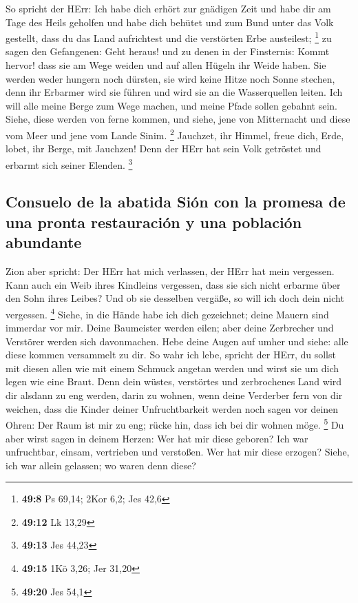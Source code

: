  So spricht der HErr: Ich habe dich erhört zur gnädigen
Zeit und habe dir am Tage des Heils geholfen und habe dich behütet und
zum Bund unter das Volk gestellt, dass du das Land aufrichtest und die
verstörten Erbe austeilest; \footnote{\textbf{49:8} Ps 69,14; 2Kor 6,2;
  Jes 42,6}  zu sagen den Gefangenen: Geht heraus! und zu
denen in der Finsternis: Kommt hervor! dass sie am Wege weiden und auf
allen Hügeln ihr Weide haben.  Sie werden weder hungern
noch dürsten, sie wird keine Hitze noch Sonne stechen, denn ihr Erbarmer
wird sie führen und wird sie an die Wasserquellen leiten.
 Ich will alle meine Berge zum Wege machen, und meine
Pfade sollen gebahnt sein.  Siehe, diese werden von ferne
kommen, und siehe, jene von Mitternacht und diese vom Meer und jene vom
Lande Sinim. \footnote{\textbf{49:12} Lk 13,29} 
Jauchzet, ihr Himmel, freue dich, Erde, lobet, ihr Berge, mit Jauchzen!
Denn der HErr hat sein Volk getröstet und erbarmt sich seiner Elenden.
\footnote{\textbf{49:13} Jes 44,23}

\hypertarget{consuelo-de-la-abatida-siuxf3n-con-la-promesa-de-una-pronta-restauraciuxf3n-y-una-poblaciuxf3n-abundante}{%
\subsection{Consuelo de la abatida Sión con la promesa de una pronta
restauración y una población
abundante}\label{consuelo-de-la-abatida-siuxf3n-con-la-promesa-de-una-pronta-restauraciuxf3n-y-una-poblaciuxf3n-abundante}}

 Zion aber spricht: Der HErr hat mich verlassen, der HErr
hat mein vergessen.  Kann auch ein Weib ihres Kindleins
vergessen, dass sie sich nicht erbarme über den Sohn ihres Leibes? Und
ob sie desselben vergäße, so will ich doch dein nicht vergessen.
\footnote{\textbf{49:15} 1Kö 3,26; Jer 31,20}  Siehe, in
die Hände habe ich dich gezeichnet; deine Mauern sind immerdar vor mir.
 Deine Baumeister werden eilen; aber deine Zerbrecher und
Verstörer werden sich davonmachen.  Hebe deine Augen auf
umher und siehe: alle diese kommen versammelt zu dir. So wahr ich lebe,
spricht der HErr, du sollst mit diesen allen wie mit einem Schmuck
angetan werden und wirst sie um dich legen wie eine Braut.
 Denn dein wüstes, verstörtes und zerbrochenes Land wird
dir alsdann zu eng werden, darin zu wohnen, wenn deine Verderber fern
von dir weichen,  dass die Kinder deiner Unfruchtbarkeit
werden noch sagen vor deinen Ohren: Der Raum ist mir zu eng; rücke hin,
dass ich bei dir wohnen möge. \footnote{\textbf{49:20} Jes 54,1}
 Du aber wirst sagen in deinem Herzen: Wer hat mir diese
geboren? Ich war unfruchtbar, einsam, vertrieben und verstoßen. Wer hat
mir diese erzogen? Siehe, ich war allein gelassen; wo waren denn diese?

